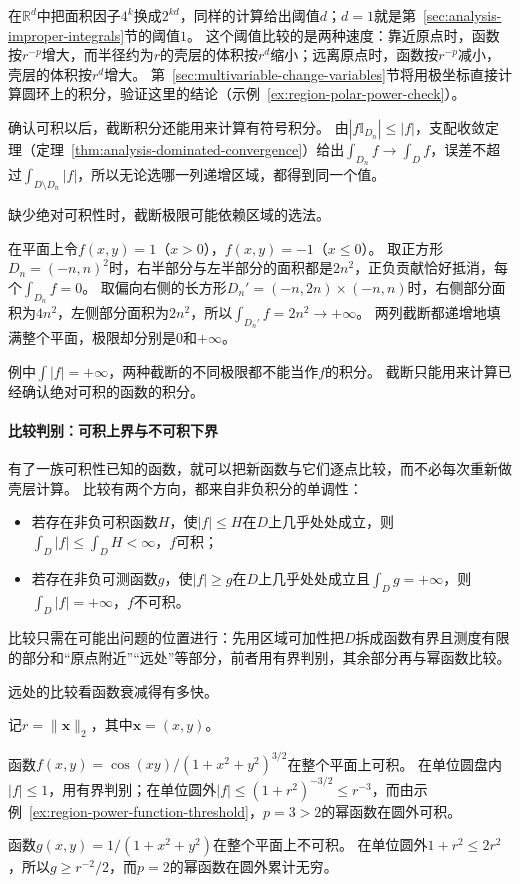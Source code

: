 在$\mathbb R^d$中把面积因子$4^k$换成$2^{kd}$，同样的计算给出阈值$d$；$d=1$就是第~\ref{sec:analysis-improper-integrals}节的阈值$1$。
这个阈值比较的是两种速度：靠近原点时，函数按$r^{-p}$增大，而半径约为$r$的壳层的体积按$r^d$缩小；远离原点时，函数按$r^{-p}$减小，壳层的体积按$r^d$增大。
第~\ref{sec:multivariable-change-variables}节将用极坐标直接计算圆环上的积分，验证这里的结论（示例~\ref{ex:region-polar-power-check}）。

确认可积以后，截断积分还能用来计算有符号积分。
由$|f\mathbb I_{D_n}|\leq|f|$，支配收敛定理（定理~\ref{thm:analysis-dominated-convergence}）给出$\int_{D_n}f\to\int_Df$，误差不超过$\int_{D\setminus D_n}|f|$，所以无论选哪一列递增区域，都得到同一个值。

缺少绝对可积性时，截断极限可能依赖区域的选法。
\begin{example}[截断极限依赖截断方式]
\label{ex:region-truncation-dependence}
在平面上令$f(x,y)=1$（$x>0$），$f(x,y)=-1$（$x\leq0$）。
取正方形$D_n=(-n,n)^2$时，右半部分与左半部分的面积都是$2n^2$，正负贡献恰好抵消，每个$\int_{D_n}f=0$。
取偏向右侧的长方形$D_n'=(-n,2n)\times(-n,n)$时，右侧部分面积为$4n^2$，左侧部分面积为$2n^2$，所以$\int_{D_n'}f=2n^2\to+\infty$。
两列截断都递增地填满整个平面，极限却分别是$0$和$+\infty$。
\end{example}

例中$\int|f|=+\infty$，两种截断的不同极限都不能当作$f$的积分。
截断只能用来计算已经确认绝对可积的函数的积分。

\paragraph{比较判别：可积上界与不可积下界}

有了一族可积性已知的函数，就可以把新函数与它们逐点比较，而不必每次重新做壳层计算。
比较有两个方向，都来自非负积分的单调性：
\begin{itemize}
 \item 若存在非负可积函数$H$，使$|f|\leq H$在$D$上几乎处处成立，则$\int_D|f|\leq\int_DH<\infty$，$f$可积；
 \item 若存在非负可测函数$g$，使$|f|\geq g$在$D$上几乎处处成立且$\int_Dg=+\infty$，则$\int_D|f|=+\infty$，$f$不可积。
\end{itemize}
比较只需在可能出问题的位置进行：先用区域可加性把$D$拆成函数有界且测度有限的部分和“原点附近”“远处”等部分，前者用有界判别，其余部分再与幂函数比较。

远处的比较看函数衰减得有多快。
\begin{example}[远处与$r^{-3}$和$r^{-2}$比较]
\label{ex:region-comparison-at-infinity}
记$r=\lVert\bm x\rVert_2$，其中$\bm x=(x,y)$。

函数$f(x,y)=\cos(xy)/(1+x^2+y^2)^{3/2}$在整个平面上可积。
在单位圆盘内$|f|\leq1$，用有界判别；在单位圆外$|f|\leq(1+r^2)^{-3/2}\leq r^{-3}$，而由示例~\ref{ex:region-power-function-threshold}，$p=3>2$的幂函数在圆外可积。

函数$g(x,y)=1/(1+x^2+y^2)$在整个平面上不可积。
在单位圆外$1+r^2\leq2r^2$，所以$g\geq r^{-2}/2$，而$p=2$的幂函数在圆外累计无穷。
\end{example}


